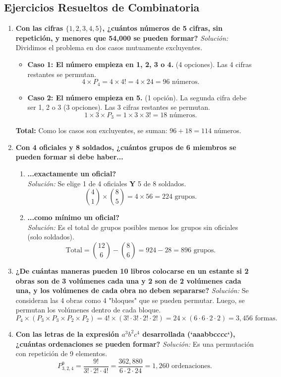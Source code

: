 \documentclass[12pt, letterpaper]{article}
\begin{document}
\subsection{Ejercicios Resueltos de Combinatoria}
\begin{enumerate}
	\item \textbf{Con las cifras $\{1, 2, 3, 4, 5\}$, ¿cuántos números de 5 cifras, sin repetición, y menores que 54,000 se pueden formar?}
	      \textit{Solución:} Dividimos el problema en dos casos mutuamente excluyentes.
	      \begin{itemize}
		      \item \textbf{Caso 1: El número empieza en 1, 2, 3 o 4.} (4 opciones). Las 4 cifras restantes se permutan.
		            \[ 4 \times P_4 = 4 \times 4! = 4 \times 24 = 96 \text{ números.} \]
		      \item \textbf{Caso 2: El número empieza en 5.} (1 opción). La segunda cifra debe ser 1, 2 o 3 (3 opciones). Las 3 cifras restantes se permutan.
		            \[ 1 \times 3 \times P_3 = 1 \times 3 \times 3! = 18 \text{ números.} \]
	      \end{itemize}
	      \textbf{Total:} Como los casos son excluyentes, se suman: $96 + 18 = 114$ números.

	\item \textbf{Con 4 oficiales y 8 soldados, ¿cuántos grupos de 6 miembros se pueden formar si debe haber...}
	      \begin{enumerate}
		      \item \textbf{...exactamente un oficial?} \\
		            \textit{Solución:} Se elige 1 de 4 oficiales \textbf{Y} 5 de 8 soldados.
		            \[ \binom{4}{1} \times \binom{8}{5} = 4 \times 56 = 224 \text{ grupos.} \]
		      \item \textbf{...como mínimo un oficial?} \\
		            \textit{Solución:} Es el total de grupos posibles menos los grupos sin oficiales (solo soldados).
		            \[ \text{Total} = \binom{12}{6} - \binom{8}{6} = 924 - 28 = 896 \text{ grupos.} \]
	      \end{enumerate}

	\item \textbf{¿De cuántas maneras pueden 10 libros colocarse en un estante si 2 obras son de 3 volúmenes cada una y 2 son de 2 volúmenes cada una, y los volúmenes de cada obra no deben separarse?}
	      \textit{Solución:} Se consideran las 4 obras como 4 "bloques" que se pueden permutar. Luego, se permutan los volúmenes dentro de cada bloque.
	            \[ P_4 \times (P_3 \times P_3 \times P_2 \times P_2) = 4! \times (3! \cdot 3! \cdot 2! \cdot 2!) = 24 \times (6 \cdot 6 \cdot 2 \cdot 2) = 3,456 \text{ formas.} \]

	\item \textbf{Con las letras de la expresión \texorpdfstring{$a^3b^2c^4$}{a3b2c4} desarrollada (`aaabbcccc`), ¿cuántas ordenaciones se pueden formar?}
	      \textit{Solución:} Es una permutación con repetición de 9 elementos.
	      \[ P_{3,2,4}^{9} = \frac{9!}{3! \cdot 2! \cdot 4!} = \frac{362,880}{6 \cdot 2 \cdot 24} = 1,260 \text{ ordenaciones.} \]
\end{enumerate}
\newpage
\end{document}
